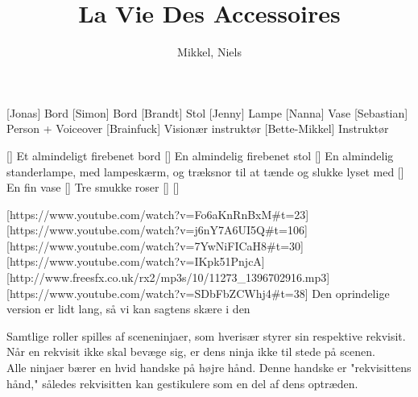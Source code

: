 \documentclass[a4paper,11pt]{article}
\title{La Vie Des Accessoires}
\author{Mikkel, Niels}
\begin{document}
\maketitle

\begin{roles}
[Jonas] Bord
[Simon] Bord
[Brandt] Stol
[Jenny] Lampe
[Nanna] Vase
[Sebastian] Person + Voiceover
[Brainfuck] Visionær instruktør
[Bette-Mikkel] Instruktør
\end{roles}

\begin{props}
[] Et almindeligt firebenet bord
[] En almindelig firebenet stol
[] En almindelig standerlampe, med lampeskærm, og træksnor til at tænde og slukke lyset med
[] En fin vase
[] Tre smukke roser
[]
[]

[https://www.youtube.com/watch?v=Fo6aKnRnBxM\#t=23]
[https://www.youtube.com/watch?v=j6nY7A6UI5Q\#t=106]
[https://www.youtube.com/watch?v=7YwNiFICaH8\#t=30]
[https://www.youtube.com/watch?v=IKpk51PnjcA]
[http://www.freesfx.co.uk/rx2/mp3s/10/11273\_1396702916.mp3]
[https://www.youtube.com/watch?v=SDbFbZCWhj4\#t=38] Den oprindelige version er lidt lang, så vi kan sagtens skære i den 
\end{props}
Samtlige roller spilles af sceneninjaer, som hverisær styrer sin respektive rekvisit.\\
Når en rekvisit ikke skal bevæge sig, er dens ninja ikke til stede på scenen.\\
Alle ninjaer bærer en hvid handske på højre hånd. Denne handske er "rekvisittens hånd," således rekvisitten kan gestikulere som en del af dens optræden.
\end{document}
